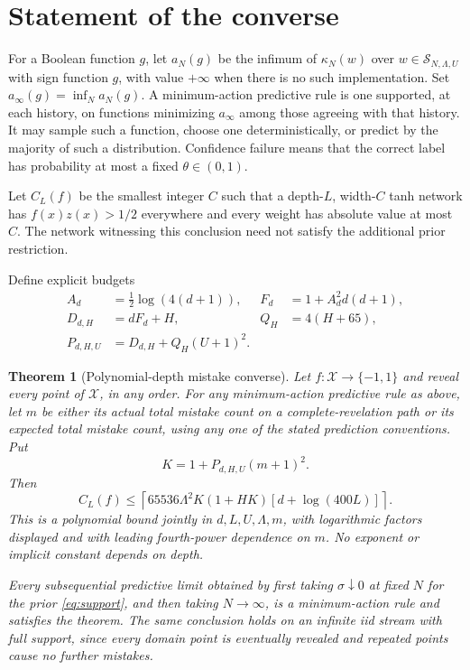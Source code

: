 \documentclass[11pt]{article}
\newtheorem{theorem}{Theorem}[section]
\theoremstyle{remark}\newtheorem{remark}[theorem]{Remark}
\newcommand{\cX}{\mathcal X}\newcommand{\cS}{\mathcal S}
\begin{document}
\section{Statement of the converse}\label{sec:statement}
For a Boolean function $g$, let $a_N(g)$ be the infimum of
$\kappa_N(w)$ over $w\in\cS_{N,\Lambda,U}$ with sign function $g$,
with value $+\infty$ when there is no such implementation. Set
$a_\infty(g)=\inf_N a_N(g)$.
A minimum-action predictive rule is one supported, at each history, on
functions minimizing $a_\infty$ among those agreeing with that history.
It may sample such a function, choose one deterministically, or predict
by the majority of such a distribution. Confidence failure means that
the correct label has probability at most a fixed $\theta\in(0,1)$.

Let $C_L(f)$ be the smallest integer $C$ such that a depth-$L$, width-$C$
tanh network has $f(x)z(x)>1/2$ everywhere and every weight has absolute
value at most $C$. The network witnessing this conclusion need not
satisfy the additional prior restriction.

Define explicit budgets
\begin{align*}
 A_d&=\tfrac12\log(4(d+1)),& F_d&=1+A_d^2d(d+1),\\
 D_{d,H}&=dF_d+H,& Q_H&=4(H+65),\\
 P_{d,H,U}&=D_{d,H}+Q_H(U+1)^2.
\end{align*}

\begin{theorem}[Polynomial-depth mistake converse]\label{thm:main}
Let $f:\cX\to\{-1,1\}$ and reveal every point of $\cX$, in any order.
For any minimum-action predictive rule as above, let $m$ be either its
actual total mistake count on a complete-revelation path or its expected
total mistake count, using any one of the stated prediction conventions.
Put
\[
 K=1+P_{d,H,U}(m+1)^2.
\]
Then
\begin{equation}\label{eq:main}
 C_L(f)\le
 \left\lceil65536\Lambda^2K(1+HK)
                   [d+\log(400L)]\right\rceil.
\end{equation}
This is a polynomial bound jointly in $d,L,U,\Lambda,m$, with
logarithmic factors displayed and with leading fourth-power dependence
on $m$. No exponent or implicit constant depends on depth.

Every subsequential predictive limit obtained by first taking
$\sigma\downarrow0$ at fixed $N$ for the prior
\eqref{eq:support}, and then taking $N\to\infty$, is a
minimum-action rule and satisfies the theorem. The same conclusion holds
on an infinite iid stream with full support, since every domain point is
eventually revealed and repeated points cause no further mistakes.
\end{theorem}
\end{document}
